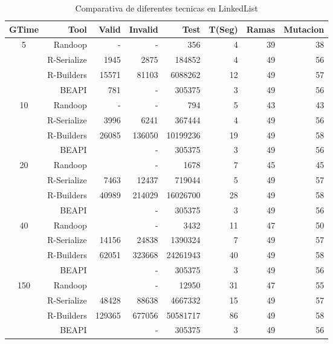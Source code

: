 \begin{table}[H]
\scriptsize
\centering
\label{tab:results-obj1}
\begin{tabular}{ c  r  |r | r | r|r|r|r  }
  \toprule
  \textbf{GTime} & \textbf{Tool} & \textbf{Valid}  & \textbf{Invalid} & \textbf{Test}&\textbf{T(Seg)} &\textbf{Ramas}  & \textbf{Mutacion} \\ 
  \midrule
5	&	Randoop	&	-	&	-	&	356	&	4	&	39	&	38	\\
	&	R-Serialize	&	1945	&	2875	&	184852	&	4	&	49	&	56	\\
	&	R-Builders	&	15571	&	81103	&	6088262	&	12	&	49	&	57	\\
	&	BEAPI	&	781	&	-	&	305375	&	3	&	49	&	56	\\
 \cline{2-8}															
10	&	Randoop	&	-	&	-	&	794	&	5	&	43	&	43	\\
	&	R-Serialize	&	3996	&	6241	&	367444	&	4	&	49	&	56	\\
	&	R-Builders	&	26085	&	136050	&	10199236	&	19	&	49	&	58	\\
	&	BEAPI	&		&	-	&	305375	&	3	&	49	&	56	\\
 \cline{2-8}															
20	&	Randoop	&		&	-	&	1678	&	7	&	45	&	45	\\
	&	R-Serialize	&	7463	&	12437	&	719044	&	5	&	49	&	57	\\
	&	R-Builders	&	40989	&	214029	&	16026700	&	28	&	49	&	58	\\
	&	BEAPI	&		&	-	&	305375	&	3	&	49	&	56	\\
 \cline{2-8}															
40	&	Randoop	&		&	-	&	3432	&	11	&	47	&	50	\\
	&	R-Serialize	&	14156	&	24838	&	1390324	&	7	&	49	&	57	\\
	&	R-Builders	&	62051	&	323668	&	24261943	&	40	&	49	&	58	\\
	&	BEAPI	&		&	-	&	305375	&	3	&	49	&	56	\\
 \cline{2-8}															
150	&	Randoop	&		&	-	&	12950	&	31	&	47	&	55	\\
	&	R-Serialize	&	48428	&	88638	&	4667332	&	15	&	49	&	57	\\
	&	R-Builders	&	129365	&	677056	&	50581717	&	86	&	49	&	58	\\
	&	BEAPI	&		&	-	&	305375	&	3	&	49	&	56	\\
\midrule
\end{tabular}
\caption{Comparativa de diferentes tecnicas en LinkedList}
\end{table}


